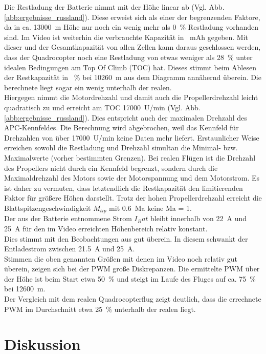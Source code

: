 Die Restladung der Batterie nimmt mit der Höhe linear ab (Vgl. Abb.\ref{abb:ergebnisse_russland}). Diese erweist sich als einer der begrenzenden Faktore, da in ca. \SI{13000}{m} Höhe nur noch ein wenig mehr als \SI{0}{\%} Restladung vorhanden sind. Im Video ist weiterhin die verbrauchte Kapazität in \SI{}{mAh} gegeben. Mit dieser und der Gesamtkapazität von allen Zellen kann daraus geschlossen werden, dass der Quadrocopter noch eine Restladung von etwas weniger als \SI{28}{\%} unter idealen Bedingungen am Top Of Climb (TOC) hat. Dieses stimmt beim Ablesen der Restkapazität in \SI{}{\%} bei \SI{10260}{m} aus dem Diagramm annähernd überein. Die berechnete liegt sogar ein wenig unterhalb der realen. \\
Hiergegen nimmt die Motordrehzahl und damit auch die Propellerdrehzahl leicht quadratisch zu und erreicht am TOC \SI{17000}{U/min} (Vgl. Abb.\ref{abb:ergebnisse_russland}).  
Dies entspricht auch der maximalen Drehzahl des APC-Kennfeldes. Die Berechnung wird abgebrochen, weil das Kennfeld für Drehzahlen von über \SI{17000}{U/min} keine Daten mehr liefert. Erstaunlicher Weise erreichen sowohl die Restladung und Drehzahl simultan die Minimal- bzw. Maximalwerte (vorher bestimmten Grenzen). Bei realen Flügen ist die Drehzahl des Propellers nicht durch ein Kennfeld begrenzt, sondern durch die Maximaldrehzahl des Motors sowie der Motorspannung und dem Motorstrom. Es ist daher zu vermuten, dass letztendlich die Restkapazität den limitierenden Faktor für größere Höhen darstellt. Trotz der hohen Propellerdrehzahl erreicht die Blattspitzengeschwindigkeit \ensuremath{M_{tip}} mit \SI{0.6}{Ma} keine Ma = 1. \\
Der aus der Batterie entnommene Strom \ensuremath{I_Bat} bleibt innerhalb von \SI{22}{A} und \SI{25}{A} für den im Video erreichten Höhenbereich relativ konstant. \\
Dies stimmt mit den Beobachtungen aus \cite{Anderson.2018} gut überein. In diesem schwankt der Entladestrom zwischen \SI{21,5}{A} und \SI{25}{A}. \\
Stimmen die oben genannten Größen mit denen im Video noch relativ gut überein, zeigen sich bei der PWM große Diskrepanzen. Die ermittelte PWM über der Höhe ist beim Start etwa \SI{50}{\%} und steigt im Laufe des Fluges auf ca. \SI{75}{\%} bei \SI{12600}{m}. \\
Der Vergleich mit dem realen Quadrocopterflug zeigt deutlich, dass die errechnete PWM im Durchschnitt etwa \SI{25}{\%} unterhalb der realen liegt.


\section{Diskussion}
\label{sec:nachbildung_diskussion}

